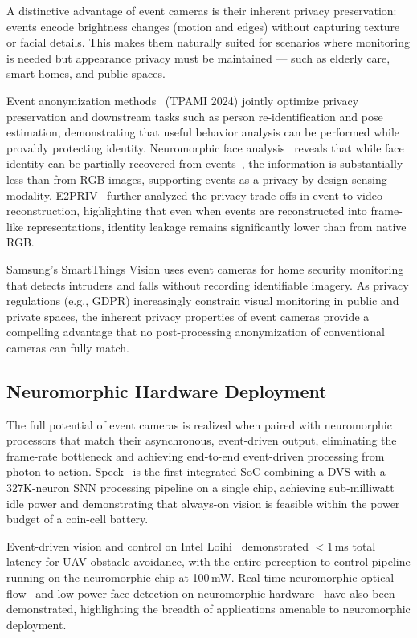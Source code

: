 A distinctive advantage of event cameras is their inherent privacy preservation: events encode brightness changes (motion and edges) without capturing texture or facial details. This makes them naturally suited for scenarios where monitoring is needed but appearance privacy must be maintained --- such as elderly care, smart homes, and public spaces.

Event anonymization methods~\cite{ahmad2024eventanontpami} (TPAMI 2024) jointly optimize privacy preservation and downstream tasks such as person re-identification and pose estimation, demonstrating that useful behavior analysis can be performed while provably protecting identity. Neuromorphic face analysis~\cite{berlincioni2024facesurvey} reveals that while face identity can be partially recovered from events~\cite{barua2022faceidentity}, the information is substantially less than from RGB images, supporting events as a privacy-by-design sensing modality. E2PRIV~\cite{wang2024e2priv} further analyzed the privacy trade-offs in event-to-video reconstruction, highlighting that even when events are reconstructed into frame-like representations, identity leakage remains significantly lower than from native RGB.

Samsung's SmartThings Vision uses event cameras for home security monitoring that detects intruders and falls without recording identifiable imagery. As privacy regulations (e.g., GDPR) increasingly constrain visual monitoring in public and private spaces, the inherent privacy properties of event cameras provide a compelling advantage that no post-processing anonymization of conventional cameras can fully match.


\subsection{Neuromorphic Hardware Deployment}
\label{sec:appl_hardware}

The full potential of event cameras is realized when paired with neuromorphic processors that match their asynchronous, event-driven output, eliminating the frame-rate bottleneck and achieving end-to-end event-driven processing from photon to action. Speck~\cite{bauer2023speck} is the first integrated SoC combining a DVS with a 327K-neuron SNN processing pipeline on a single chip, achieving sub-milliwatt idle power and demonstrating that always-on vision is feasible within the power budget of a coin-cell battery.

Event-driven vision and control on Intel Loihi~\cite{paredes2023neurochip} demonstrated $<$1\,ms total latency for UAV obstacle avoidance, with the entire perception-to-control pipeline running on the neuromorphic chip at 100\,mW. Real-time neuromorphic optical flow~\cite{shiba2023neuromorphicof} and low-power face detection on neuromorphic hardware~\cite{li2023lowpowerface} have also been demonstrated, highlighting the breadth of applications amenable to neuromorphic deployment.

